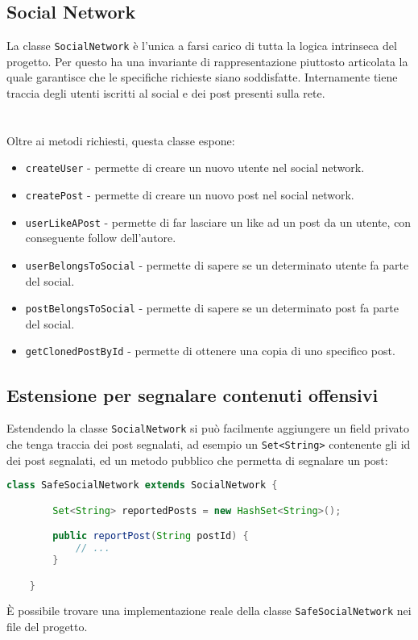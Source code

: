 \documentclass[a4paper,10pt]{article}
\begin{document}
\subsection*{Social Network}
La classe \texttt{SocialNetwork} è l'unica a farsi carico di tutta la logica intrinseca del progetto. Per questo ha una invariante di rappresentazione piuttosto articolata la quale
garantisce che le specifiche richieste siano soddisfatte. Internamente tiene traccia degli utenti iscritti al social e dei post presenti sulla rete.
\\~\\~\\
Oltre ai metodi richiesti, questa classe espone:

\begin{itemize}
    \item \texttt{createUser} - permette di creare un nuovo utente nel social network.
    \item \texttt{createPost} - permette di creare un nuovo post nel social network.
    \item \texttt{userLikeAPost} - permette di far lasciare un like ad un post da un utente, con conseguente follow dell'autore.
    \item \texttt{userBelongsToSocial} - permette di sapere se un determinato utente fa parte del social.
    \item \texttt{postBelongsToSocial} - permette di sapere se un determinato post fa parte del social.
    \item \texttt{getClonedPostById} - permette di ottenere una copia di uno specifico post.
\end{itemize}


\subsection*{Estensione per segnalare contenuti offensivi}
Estendendo la classe \texttt{SocialNetwork} si può facilmente aggiungere un field privato che tenga traccia dei post segnalati,
ad esempio un \texttt{Set<String>} contenente gli id dei post segnalati, ed un metodo pubblico che permetta di segnalare un post:
\begin{lstlisting}[language=java]
    class SafeSocialNetwork extends SocialNetwork {

        Set<String> reportedPosts = new HashSet<String>();

        public reportPost(String postId) {
            // ...
        }

    }
\end{lstlisting}
È possibile trovare una implementazione reale della classe \texttt{SafeSocialNetwork} nei file del progetto.
\end{document}

